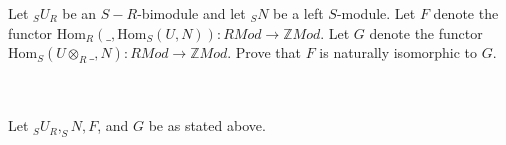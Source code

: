 Let $_SU_R$ be an $S-R$-bimodule and let $_SN$ be a left $S$-module. Let $F$ denote the functor
$\text{Hom}_R(\_,\text{Hom}_S(U,N)):RMod\to \mathbb{Z}Mod$. Let $G$ denote the functor
$\text{Hom}_S(U\otimes_R\_,N):RMod\to \mathbb{Z}Mod$. Prove that $F$ is naturally isomorphic to $G$.\\\\

\begin{solution}\renewcommand{\qedsymbol}{}\ \\
    Let $_SU_R, _SN, F$, and $G$ be as stated above.
\end{solution}